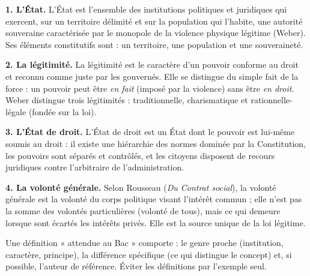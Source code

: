 \documentclass[11pt]{article}
\begin{document}
\begin{corrige}
\textbf{1. L'État.} L'État est l'ensemble des institutions politiques et juridiques qui exercent, sur un territoire délimité et sur la population qui l'habite, une autorité souveraine caractérisée par le monopole de la violence physique légitime (Weber). Ses éléments constitutifs sont : un territoire, une population et une souveraineté.

\textbf{2. La légitimité.} La légitimité est le caractère d'un pouvoir conforme au droit et reconnu comme juste par les gouvernés. Elle se distingue du simple fait de la force : un pouvoir peut être \emph{en fait} (imposé par la violence) sans être \emph{en droit}. Weber distingue trois légitimités : traditionnelle, charismatique et rationnelle-légale (fondée sur la loi).

\textbf{3. L'État de droit.} L'État de droit est un État dont le pouvoir est lui-même soumis au droit : il existe une hiérarchie des normes dominée par la Constitution, les pouvoirs sont séparés et contrôlés, et les citoyens disposent de recours juridiques contre l'arbitraire de l'administration.

\textbf{4. La volonté générale.} Selon Rousseau (\emph{Du Contrat social}), la volonté générale est la volonté du corps politique visant l'intérêt commun ; elle n'est pas la somme des volontés particulières (volonté de tous), mais ce qui demeure lorsque sont écartés les intérêts privés. Elle est la source unique de la loi légitime.
\end{corrige}

\begin{attention}
Une définition « attendue au Bac » comporte : le genre proche (institution, caractère, principe), la différence spécifique (ce qui distingue le concept) et, si possible, l'auteur de référence. Éviter les définitions par l'exemple seul.
\end{attention}
\end{document}

